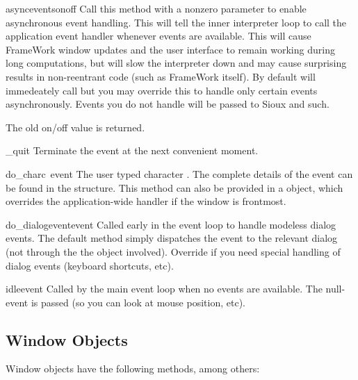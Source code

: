 \begin{funcdesc}{asyncevents}{onoff}
Call this method with a nonzero parameter to enable
asynchronous event handling. This will tell the inner interpreter loop
to call the application event handler  whenever events
are available. This will cause FrameWork window updates and the user
interface to remain working during long computations, but will slow the
interpreter down and may cause surprising results in non-reentrant code
(such as FrameWork itself). By default  will immedeately
call  but you may override this to handle only certain
events asynchronously. Events you do not handle will be passed to Sioux
and such.

The old on/off value is returned.
\end{funcdesc}

\begin{funcdesc}{_quit}{}
Terminate the event  at the next convenient moment.
\end{funcdesc}

\begin{funcdesc}{do_char}{c\, event}
The user typed character . The complete details of the event
can be found in the  structure. This method can also be
provided in a  object, which overrides the
application-wide handler if the window is frontmost.
\end{funcdesc}

\begin{funcdesc}{do_dialogevent}{event}
Called early in the event loop to handle modeless dialog events. The
default method simply dispatches the event to the relevant dialog (not
through the the  object involved). Override if you
need special handling of dialog events (keyboard shortcuts, etc).
\end{funcdesc}

\begin{funcdesc}{idle}{event}
Called by the main event loop when no events are available. The
null-event is passed (so you can look at mouse position, etc).
\end{funcdesc}

\subsection{Window Objects}

Window objects have the following methods, among others:

